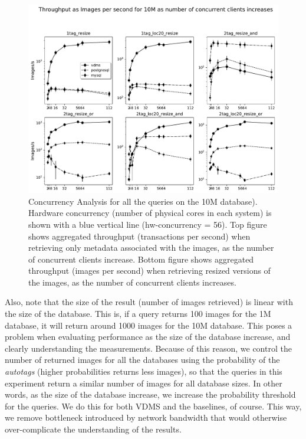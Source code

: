 \begin{figure}[ht]
\includegraphics[width=\textwidth]{figures/plot_conc_dbsize_10M_mosaic_results_throughput}
\caption{Concurrency Analysis for all the queries on the 10M database).
Hardware concurrency (number of physical cores in each system)
is shown with a blue vertical line (hw-concurrency = 56).
Top figure shows aggregated throughput (transactions per second)
when retrieving only metadata associated with the images, as the number of
concurrent clients increase.
Bottom figure shows aggregated throughput (images per second) when retrieving
resized versions of the images, as the number of concurrent clients increases.}
\label{fig:concurrency_comparison_10M}
\end{figure}

Also, note that the size of the result (number of images retrieved)
is linear with the size of the database. This is, if a query returns 100 images
for the 1M database, it will return around 1000 images for the 10M database.
This poses a problem when evaluating performance as the size of the database increase,
and clearly understanding the measurements.
Because of this reason, we control the number of returned images for all the
databases using the probability of the \textit{autotags}
(higher probabilities returns less images), so that the queries in
this experiment return a similar number of images for all database sizes.
In other words, as the size of the database increase, we increase the probability
threshold for the queries. We do this for both VDMS and the baselines, of course.
This way, we remove bottleneck introduced by network bandwidth that would
otherwise over-complicate the understanding of the results.

